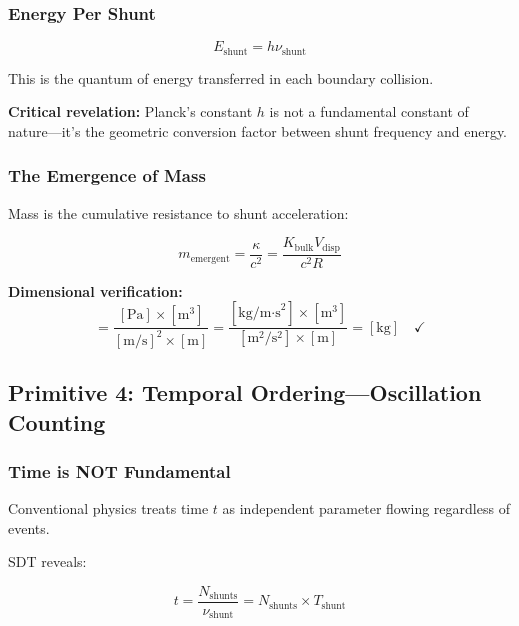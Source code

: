 \subsubsection{Energy Per Shunt}

\begin{equation}
E_{\text{shunt}} = h \nu_{\text{shunt}}
\label{eq:energy_shunt}
\end{equation}

This is the quantum of energy transferred in each boundary collision.

\textbf{Critical revelation:} Planck's constant $h$ is not a fundamental constant of nature—it's the geometric conversion factor between shunt frequency and energy.

\subsubsection{The Emergence of Mass}

Mass is the cumulative resistance to shunt acceleration:

\begin{equation}
m_{\text{emergent}} = \frac{\kappa}{c^2} = \frac{K_{\text{bulk}} V_{\text{disp}}}{c^2 R}
\label{eq:mass_emergence}
\end{equation}

\textbf{Dimensional verification:}
\begin{equation}
[m] = \frac{[\text{Pa}] \times [\text{m}^3]}{[\text{m/s}]^2 \times [\text{m}]} = \frac{[\text{kg/m·s}^2] \times [\text{m}^3]}{[\text{m}^2/\text{s}^2] \times [\text{m}]} = [\text{kg}] \quad \checkmark
\end{equation}

\subsection{Primitive 4: Temporal Ordering—Oscillation Counting}

\subsubsection{Time is NOT Fundamental}

Conventional physics treats time $t$ as independent parameter flowing regardless of events.

SDT reveals:

\begin{equation}
\boxed{t = \frac{N_{\text{shunts}}}{\nu_{\text{shunt}}} = N_{\text{shunts}} \times T_{\text{shunt}}}
\label{eq:time_counting}
\end{equation}

